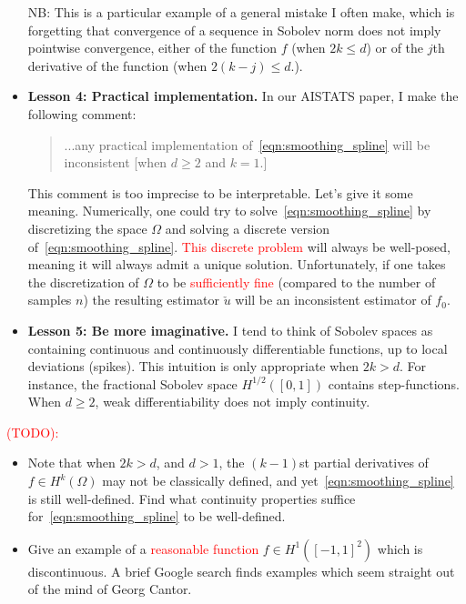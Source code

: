 \documentclass{article}
\newcommand{\1}{\mathbf{1}}
\theoremstyle{alden}
\theoremstyle{aldenthm}
\theoremstyle{definition}
\theoremstyle{remark}
\begin{document}
\begin{itemize}
	NB: This is a particular example of a general mistake I often make, which is forgetting that convergence of a sequence in Sobolev norm does not imply pointwise convergence, either of the function $f$ (when $2k \leq d$) or of the $j$th derivative of the function (when $2(k - j) \leq d$.).
	\item \textbf{Lesson 4: Practical implementation.} In our AISTATS paper,  I make the following comment:
	\begin{quotation}
		...any practical implementation of~\eqref{eqn:smoothing_spline} will be inconsistent [when $d \geq 2$ and $k = 1$.]
	\end{quotation}
	This comment is too imprecise to be interpretable. Let's give it some meaning. Numerically, one could try to solve~\eqref{eqn:smoothing_spline} by discretizing the space $\Omega$ and solving a discrete version of~\eqref{eqn:smoothing_spline}. \textcolor{red}{This discrete problem} will always be well-posed, meaning it will always admit a unique solution. Unfortunately, if one takes the discretization of $\Omega$ to be \textcolor{red}{sufficiently fine} (compared to the number of samples $n$) the resulting estimator $\check{u}$ will be an inconsistent estimator of $f_0$.
	\item \textbf{Lesson 5: Be more imaginative.} I tend to think of Sobolev spaces as containing continuous and continuously differentiable functions, up to local deviations (spikes). This intuition is only appropriate when $2k > d$. For instance, the fractional Sobolev space $H^{1/2}([0,1])$ contains step-functions. When $d \geq 2$, weak differentiability does not imply continuity. 
\end{itemize}

\textcolor{red}{(TODO):}
\begin{itemize}
	\item Note that when $2k > d$, and $d > 1$, the $(k-1)$st partial derivatives of $f \in H^k(\Omega)$ may not be classically defined, and yet~\eqref{eqn:smoothing_spline} is still well-defined. Find what continuity properties suffice for~\eqref{eqn:smoothing_spline} to be well-defined.
	\item Give an example of a \textcolor{red}{reasonable function} $f \in H^1([-1,1]^2)$ which is discontinuous. A brief Google search finds examples which seem straight out of the mind of Georg Cantor.
\end{itemize}
\end{document}
